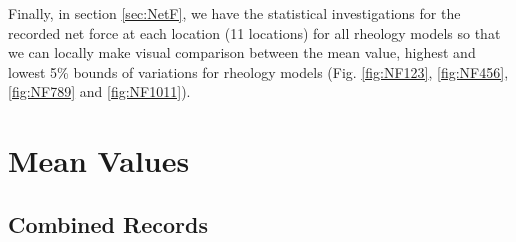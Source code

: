 \documentclass[a4paper,10pt]{article}
\begin{document}
Finally, in section \ref{sec:NetF}, we have the statistical investigations for the recorded net force at each location (11 locations) for all rheology models so that we can locally make visual comparison between the mean value, highest and lowest 5\% bounds of variations for rheology models (Fig. \ref{fig:NF123}, \ref{fig:NF456}, \ref{fig:NF789} and \ref{fig:NF1011}).

\section{Mean Values}\label{sec:MVs}

\subsection{Combined Records}\label{sec:MV_comb}
\begin{figure}[H]


\end{figure}
\end{document}
